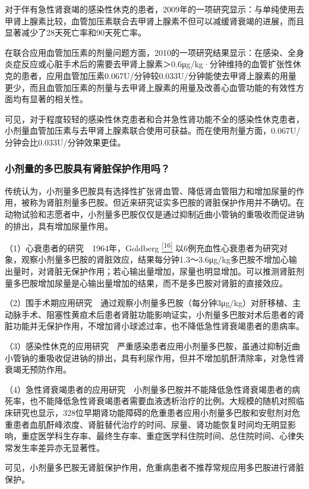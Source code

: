对于伴有急性肾衰竭的感染性休克的患者，2009年的一项研究显示：与单纯使用去甲肾上腺素比较，血管加压素联合去甲肾上腺素不但可以减缓肾衰竭的进展，而且显著减少了28天死亡率和90天死亡率。

在联合应用血管加压素的剂量问题方面，2010的一项研究结果显示：在感染、全身炎症反应或心脏手术后的需要去甲肾上腺素＞0.6μg/kg·分钟维持的血管扩张性休克的患者，应用血管加压素0.067U/分钟较0.033U/分钟能使去甲肾上腺素的用量更少，而且血管加压素的剂量与去甲肾上腺素的用量及改善心血管功能的有效性方面均有显著的相关性。

可见，对于程度较轻的感染性休克患者和合并急性肾功能不全的感染性休克患者，小剂量血管加压素与去甲肾上腺素联合使用可获益。而在使用剂量方面，0.067U/分钟会比0.033U/分钟效果更佳。

\subsubsection{小剂量的多巴胺具有肾脏保护作用吗？}

传统认为，小剂量多巴胺具有选择性扩张肾血管、降低肾血管阻力和增加尿量的作用，被称为肾脏剂量多巴胺。但近来研究证实多巴胺的肾脏保护作用并不确切。在动物试验和志愿者中，小剂量多巴胺仅仅是通过抑制近曲小管钠的重吸收而促进钠的排出，具有增加尿量作用。

（1）心衰患者的研究　1964年，Goldberg
\protect\hyperlink{text00008.htmlux5cux23ch16-7}{\textsuperscript{{[}16{]}}}
以6例充血性心衰患者为研究对象，观察小剂量多巴胺的肾脏效应，结果每分钟1.3～3.6μg/kg多巴胺不增加心输出量时，对肾脏无保护作用；若心输出量增加，尿量也明显增加。可以推测肾脏剂量多巴胺增加尿量是心输出量增加的结果，而不是多巴胺对肾脏的直接效应。

（2）围手术期应用研究　通过观察小剂量多巴胺（每分钟3μg/kg）对肝移植、主动脉手术、阻塞性黄疸术后患者肾脏功能影响证实，小剂量多巴胺对术后患者的肾脏功能并无保护作用，不增加肾小球滤过率，也不降低急性肾衰竭患者的患病率。

（3）感染性休克的应用研究　严重感染患者应用小剂量多巴胺，虽通过抑制近曲小管钠的重吸收促进钠的排出，具有利尿作用，但并不增加肌酐清除率，对急性肾衰竭无预防作用。

（4）急性肾衰竭患者的应用研究　小剂量多巴胺并不能降低急性肾衰竭患者的病死率，也不能降低急性肾衰竭患者需要血液透析治疗的比例。大规模的随机对照临床研究也显示，328位早期肾功能障碍的危重患者应用小剂量多巴胺和安慰剂对危重患者血肌酐峰浓度、肾脏替代治疗的时间、尿量、肾功能恢复时间均无明显影响，重症医学科生存率、最终生存率、重症医学科住院时间、总住院时间、心律失常发生率差异亦无显著性。

可见，小剂量多巴胺无肾脏保护作用，危重病患者不推荐常规应用多巴胺进行肾脏保护。

